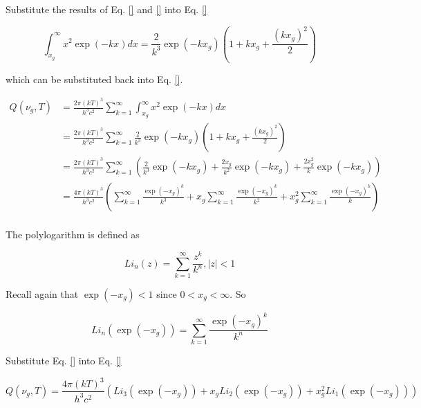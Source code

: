\documentclass[letterpaper,12pt]{article}
\begin{document}
Substitute the results of Eq. \ref{} and \ref{} into Eq. \ref{}

\begin{equation} \label{eq:17}
\int_{x_{g}}^{\infty} x^{2} \exp(-kx) dx = \frac{2}{k^{3}} \exp(-kx_{g}) \left( 1 + kx_{g} + \frac{ (kx_{g})^{2} }{2} \right)
\end{equation}

\noindent which can be substituted back into Eq. \ref{}.

\begin{align} \label{eq:18}
Q(\nu_{g}, T) &= \frac{2\pi (kT)^{3}}{h^{3} c^{2}} \sum_{k = 1}^{\infty} \int_{x_{g}}^{\infty} x^{2} \exp(-kx) dx \\
 &= \frac{2\pi (kT)^{3}}{h^{3} c^{2}} \sum_{k = 1}^{\infty} \frac{2}{k^{3}} \exp(-kx_{g}) \left( 1 + kx_{g} + \frac{ (kx_{g})^{2} }{2} \right) \\
 &= \frac{2\pi (kT)^{3}}{h^{3} c^{2}} \sum_{k = 1}^{\infty} \left( \frac{2}{k^{3}} \exp(-kx_{g}) + \frac{2x_{g}}{k^{2}} \exp(-kx_{g}) + \frac{2x_{g}^{2}}{k} \exp(-kx_{g}) \right) \\
 &= \frac{4\pi (kT)^{3}}{h^{3} c^{2}} \left(\sum_{k = 1}^{\infty} \frac{\exp(-x_{g})^{k}}{k^{3}} + x_{g} \sum_{k = 1}^{\infty} \frac{\exp(-x_{g})^{k}}{k^{2}} + x_{g}^{2} \sum_{k = 1}^{\infty} \frac{\exp(-x_{g})^{k}}{k} \right) \\
\end{align}

The polylogarithm is defined as

\begin{equation} \label{eq:22}
Li_{n}(z) = \sum_{k = 1}^{\infty} \frac{z^{k}}{k^{n}}, |z| < 1
\end{equation}

Recall again that $\exp(-x_{g}) < 1$ since $0 < x_{g} < \infty$. So

\begin{equation} \label{eq:23}
Li_{n} \left(\exp(-x_{g}) \right) = \sum_{k = 1}^{\infty} \frac{\exp(-x_{g})^{k}}{k^{n}}
\end{equation}

Substitute Eq. \ref{} into Eq. \ref{}

\begin{equation} \label{eq:24}
Q(\nu_{g}, T) = \frac{4\pi (kT)^{3}}{h^{3} c^{2}} \left(Li_{3}(\exp(-x_{g})) + x_{g} Li_{2}(\exp(-x_{g})) + x_{g}^{2} Li_{1}(\exp(-x_{g})) \right) 
\end{equation}


% 
% 
\end{document}
